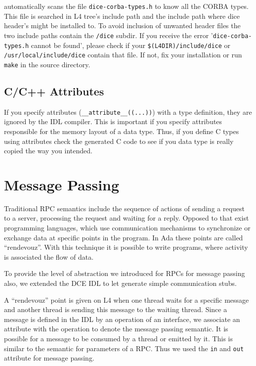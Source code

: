 \dice{} automatically scans the file \verb|dice-corba-types.h|
to know all the CORBA types. This file is searched in L4 tree's
include path and the include path where dice header's might be
installed to. To avoid inclusion of unwanted header files the
two include paths contain the \verb|/dice| subdir.
If you receive the error '\verb|dice-corba-types.h| cannot
be found', please check if your \verb|$(L4DIR)/include/dice| or
\verb|/usr/local/include/dice| contain that file. If not, fix
your installation or run \verb|make| in the \dice{} source
directory.

\subsection{C/C++ Attributes}
If you specify attributes (\verb|__attribute__((...))|)
with a type definition, they are ignored by the IDL compiler. This is
important if you specify attributes responsible for the memory
layout of a data type. Thus, if you define C types using attributes
check the generated C code to see if you data type is really copied
the way you intended.

\section{Message Passing}
\label{sec:message-passing}
Traditional RPC semantics include the sequence of actions of sending a
request to a server, processing the request and waiting for a reply.
Opposed to that exist programming languages, which use communication
mechanisms to synchronize or exchange data at specific points in the
program. In Ada these points are called ``rendevouz''. With this technique
it is possible to write programs, where activity is associated the
flow of data.

To provide the level of abstraction we introduced for RPCs for message
passing also, we extended the DCE IDL to let \dice{} generate simple
communication stubs.

A ``rendevouz'' point is given on L4 when one thread waits for a
specific message and another thread is sending this message to the
waiting thread. Since a message is defined in the IDL by an operation of an 
interface, we associate an attribute with the operation to denote 
the message passing semantic. It is possible for a message to be
consumed by a thread or emitted by it. This is similar to the semantic
for parameters of a RPC. Thus we used the \verb|in| and \verb|out|
attribute for message passing.

